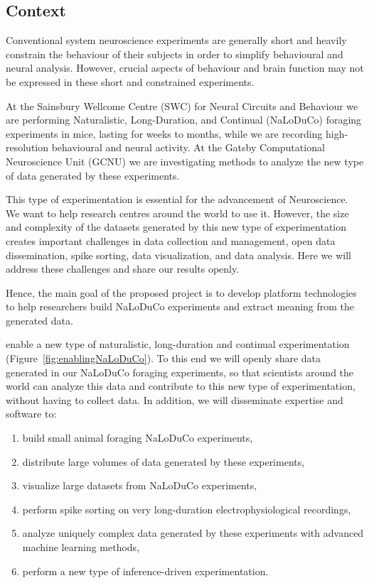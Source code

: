 \subsection{Context}

Conventional system neuroscience experiments are generally short and heavily
constrain the behaviour of their subjects in order to simplify behavioural and
neural analysis.
%
However, crucial aspects of behaviour and brain function may not be expressed in
these short and constrained experiments.

At the Sainsbury Wellcome Centre (SWC) for Neural Circuits and Behaviour we are
performing Naturalistic, Long-Duration, and Continual (NaLoDuCo) foraging
experiments in mice, lasting for weeks to months, while we are recording
high-resolution behavioural and neural activity. At the Gatsby Computational
Neuroscience Unit (GCNU) we are investigating methods to analyze the new type
of data generated by these experiments.

This type of experimentation is essential for the advancement of Neuroscience.
We want to help research centres around the world to use it. However, the size
and complexity of the datasets generated by this new type of experimentation
creates important challenges in data collection and management, open data
dissemination, spike sorting, data visualization, and data analysis.  Here we
will address these challenges and share our results openly.

Hence, the main goal of the proposed project is to develop platform
technologies to help researchers build NaLoDuCo experiments and extract meaning
from the generated data.

enable a new type of
naturalistic, long-duration and continual experimentation
(Figure~\ref{fig:enablingNaLoDuCo}). To this end we will openly share data
generated in our NaLoDuCo foraging experiments, so that scientists around the
world can analyze this data and contribute to this new type of experimentation,
without having to collect data. In addition, we will
disseminate expertise and software to:

\begin{enumerate}

    \item build small animal foraging NaLoDuCo experiments,

    \item distribute large volumes of data generated by these experiments,

    \item visualize large datasets from NaLoDuCo experiments,

    \item perform spike sorting on very long-duration electrophysiological
        recordings,

    \item analyze uniquely complex data generated by these experiments with
        advanced machine learning methods,

    \item perform a new type of inference-driven experimentation.

\end{enumerate}

